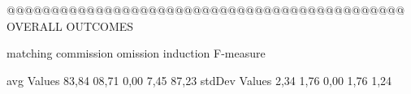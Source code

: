  @@@@@@@@@@@@@@@@@@@@@@@@@@@@@@@@@@@@@@@@@@@@@ OVERALL OUTCOMES

                matching commission   omission  induction  F-measure
      
avg Values      83,84      08,71       0,00      7,45    87,23      
stdDev Values    2,34       1,76       0,00       1,76    1,24       
